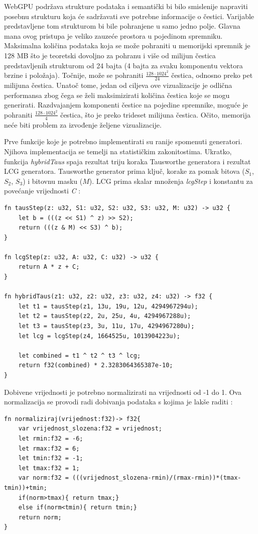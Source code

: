 \documentclass{foi}
\begin{document}
WebGPU podržava strukture podataka i semantički bi bilo smislenije napraviti posebnu strukturu koja će sadržavati sve potrebne informacije o čestici. Varijable predstavljene tom strukturom bi bile pohranjene u samo jedno polje. Glavna mana ovog pristupa je veliko zauzeće prostora u pojedinom spremniku. Maksimalna količina podataka koja se može pohraniti u memorijski spremnik je 128 MB što je teoretski dovoljno za pohranu i više od milijun čestica predstavljenih strukturom od 24 bajta (4 bajta za svaku komponentu vektora brzine i položaja). Točnije, može se pohraniti $\frac{128\cdot 1024^2}{24}$ čestica, odnosno preko pet milijuna čestica. Unatoč tome, jedan od ciljeva ove vizualizacije je odlična performansa zbog čega se želi maksimizirati količina čestica koje se mogu generirati. Razdvajanjem komponenti čestice na pojedine spremnike, moguće je pohraniti $\frac{128\cdot 1024^2}{4}$ čestica, što je preko trideset milijuna čestica. Očito, memorija neće biti problem za izvođenje željene vizualizacije.

Prve funkcije koje je potrebno implementirati su ranije spomenuti generatori. Njihova implementacija se temelji na statističkim zakonitostima. Ukratko, funkcija \textit{hybridTaus} spaja rezultat triju koraka Tausworthe generatora i rezultat LCG generatora. Tausworthe generator prima ključ, korake za pomak bitova ($S_1$, $S_2$, $S_3$) i bitovnu masku ($M$). LCG prima skalar množenja \textit{lcgStep} i konstantu za povećanje vrijednosti \textit{C} \parencite{NvidiaPRNG}:

\begin{verbatim}
fn tausStep(z: u32, S1: u32, S2: u32, S3: u32, M: u32) -> u32 {
	let b = (((z << S1) ^ z) >> S2);
	return (((z & M) << S3) ^ b);
}

fn lcgStep(z: u32, A: u32, C: u32) -> u32 {
	return A * z + C;
}

fn hybridTaus(z1: u32, z2: u32, z3: u32, z4: u32) -> f32 {
	let t1 = tausStep(z1, 13u, 19u, 12u, 4294967294u);
	let t2 = tausStep(z2, 2u, 25u, 4u, 4294967288u);
	let t3 = tausStep(z3, 3u, 11u, 17u, 4294967280u);
	let lcg = lcgStep(z4, 1664525u, 1013904223u);
	
	let combined = t1 ^ t2 ^ t3 ^ lcg;
	return f32(combined) * 2.3283064365387e-10;
}
\end{verbatim}

Dobivene vrijednosti je potrebno normalizirati na vrijednosti od -1 do 1. Ova normalizacija se provodi radi dobivanja podataka s kojima je lakše raditi \parencite{NormalizacijaPodataka}:
\begin{verbatim}
fn normaliziraj(vrijednost:f32)-> f32{
	var vrijednost_slozena:f32 = vrijednost;
	let rmin:f32 = -6;
	let rmax:f32 = 6;
	let tmin:f32 = -1;
	let tmax:f32 = 1;
	var norm:f32 = (((vrijednost_slozena-rmin)/(rmax-rmin))*(tmax-tmin))+tmin;
	if(norm>tmax){ return tmax;}
	else if(norm<tmin){ return tmin;}
	return norm;
}
\end{verbatim}
\end{document}
